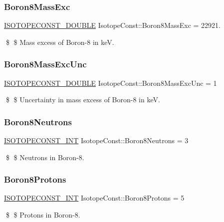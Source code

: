 \subsubsection{\texorpdfstring{Boron8\+Mass\+Exc}{Boron8MassExc}}
{\footnotesize\ttfamily \mbox{\hyperlink{group___isotope_const-_macros_ga8f45a7272ce02c0b4c65c44636ed719a}{I\+S\+O\+T\+O\+P\+E\+C\+O\+N\+S\+T\+\_\+\+D\+O\+U\+B\+LE}} Isotope\+Const\+::\+Boron8\+Mass\+Exc = 22921.}

\$ \$ Mass excess of Boron-\/8 in keV. \mbox{\label{group___isotope_const-_boron-_b8_gaddc20d490f69cb9bd11c7a0b96db861b}} 
\subsubsection{\texorpdfstring{Boron8\+Mass\+Exc\+Unc}{Boron8MassExcUnc}}
{\footnotesize\ttfamily \mbox{\hyperlink{group___isotope_const-_macros_ga8f45a7272ce02c0b4c65c44636ed719a}{I\+S\+O\+T\+O\+P\+E\+C\+O\+N\+S\+T\+\_\+\+D\+O\+U\+B\+LE}} Isotope\+Const\+::\+Boron8\+Mass\+Exc\+Unc = 1}

\$ \$ Uncertainty in mass excess of Boron-\/8 in keV. \mbox{\label{group___isotope_const-_boron-_b8_gadfd0f0e540eaa7b2312297f906b115b9}} 
\subsubsection{\texorpdfstring{Boron8\+Neutrons}{Boron8Neutrons}}
{\footnotesize\ttfamily \mbox{\hyperlink{group___isotope_const-_macros_ga5f18360b3e99483a35c32d789e62621c}{I\+S\+O\+T\+O\+P\+E\+C\+O\+N\+S\+T\+\_\+\+I\+NT}} Isotope\+Const\+::\+Boron8\+Neutrons = 3}

\$ \$ Neutrons in Boron-\/8. \mbox{\label{group___isotope_const-_boron-_b8_ga8d61a543864f36c79f4a892e0bd84a41}} 
\subsubsection{\texorpdfstring{Boron8\+Protons}{Boron8Protons}}
{\footnotesize\ttfamily \mbox{\hyperlink{group___isotope_const-_macros_ga5f18360b3e99483a35c32d789e62621c}{I\+S\+O\+T\+O\+P\+E\+C\+O\+N\+S\+T\+\_\+\+I\+NT}} Isotope\+Const\+::\+Boron8\+Protons = 5}

\$ \$ Protons in Boron-\/8. 
